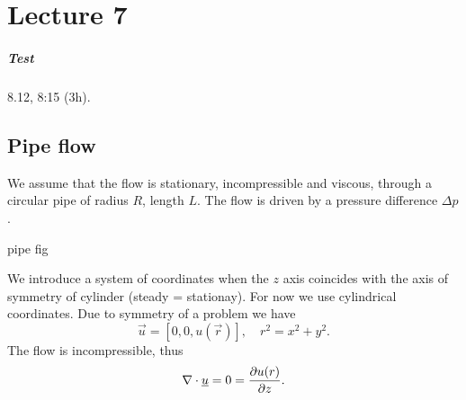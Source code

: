 \documentclass[../main.tex]{subfiles}
\begin{document}
\chapter{Lecture 7}
    \paragraph{Test} 8.12, 8:15 (3h).

    \section{Pipe flow}
    We assume that the flow is stationary, incompressible and viscous, through a circular pipe of radius $R$,
    length $L$. The flow is driven by a pressure difference $\Delta p$.

    \todo pipe fig

    We introduce a system of coordinates when the $z$ axis coincides with the axis of symmetry of cylinder (steady = stationay).
    For now we use cylindrical coordinates.
    Due to symmetry of a problem we have
    \begin{displaymath}
      \vec u = [0, 0 , u(\vec r)], \quad r^2 = x^2 +y^2.
    \end{displaymath}
    The flow is incompressible, thus
    \begin{displaymath}
      \nabla \cdot \underline{u} = 0 = \frac{\partial u(r)}{\partial z}.
    \end{displaymath}
\end{document}
